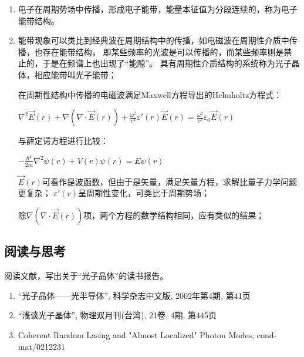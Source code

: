 \begin{enumerate}
    \item 电子在周期势场中传播，形成电子能带，能量本征值为分段连续的，称为电子能带结构。

    \item 能带现象可以类比到经典波在周期结构中的传播，如电磁波在周期性介质中传播，也存在能带结构，
即某些频率的光波是可以传播的，而某些频率则是禁止的，于是在频谱上也出现了``能隙''。
具有周期性介质结构的系统称为光子晶体，相应能带叫光子能带；

在周期性结构中传播的电磁波满足Maxwell方程导出的Helmholtz方程式：

\begin{center}
$\nabla ^2 \vec E(r) + \nabla \left( {\nabla  \cdot \vec E(r)} \right) + \frac{{\omega ^2 }}{{c^2 }}\varepsilon '(r)\vec E(r) = \frac{{\omega ^2 }}{{c^2 }}\varepsilon _0 \vec E(r)$
\end{center}

与薛定谔方程进行比较：

\begin{center}
$ - \frac{{\hbar ^2 }}{{2m}}\nabla ^2 \psi (r) + V(r)\psi (r) = E\psi (r)$
\end{center}

$\vec E(r)$可看作是波函数，但由于是矢量，满足矢量方程，求解比量子力学问题更复杂；
$\varepsilon '(r)$呈周期性变化，可类比于周期势场；

除$\nabla \left( {\nabla  \cdot \vec E(r)} \right)$项，两个方程的数学结构相同，应有类似的结果；

   \end{enumerate}

\subsection*{阅读与思考}

阅读文献，写出关于``光子晶体''的读书报告。

\begin{enumerate}
    \item ``光子晶体——光半导体'', 科学杂志中文版, 2002年第4期, 第41页
    \item ``浅谈光子晶体'', 物理双月刊(台湾), 21卷, 4期, 第445页
    \item Coherent Random Lasing and "Almost Localized" Photon Modes, cond-mat/0212231
   \end{enumerate}
